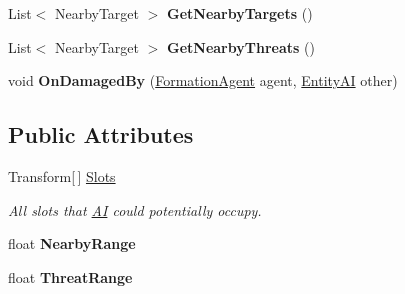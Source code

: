 \begin{DoxyCompactItemize}
\item 
\hypertarget{class_skyrates_1_1_a_i_1_1_formation_1_1_formation_owner_ac97695c48c5f56fbe39017b889326b50}{List$<$ Nearby\-Target $>$ {\bfseries Get\-Nearby\-Targets} ()}\label{class_skyrates_1_1_a_i_1_1_formation_1_1_formation_owner_ac97695c48c5f56fbe39017b889326b50}

\item 
\hypertarget{class_skyrates_1_1_a_i_1_1_formation_1_1_formation_owner_a79e5714cef6a98dc2cbbb5bcd837f475}{List$<$ Nearby\-Target $>$ {\bfseries Get\-Nearby\-Threats} ()}\label{class_skyrates_1_1_a_i_1_1_formation_1_1_formation_owner_a79e5714cef6a98dc2cbbb5bcd837f475}

\item 
\hypertarget{class_skyrates_1_1_a_i_1_1_formation_1_1_formation_owner_a8d9a35b95cc2963ba9741e5c93bc9670}{void {\bfseries On\-Damaged\-By} (\hyperlink{class_skyrates_1_1_a_i_1_1_formation_1_1_formation_agent}{Formation\-Agent} agent, \hyperlink{class_skyrates_1_1_entity_1_1_entity_a_i}{Entity\-A\-I} other)}\label{class_skyrates_1_1_a_i_1_1_formation_1_1_formation_owner_a8d9a35b95cc2963ba9741e5c93bc9670}

\end{DoxyCompactItemize}
\subsection*{Public Attributes}
\begin{DoxyCompactItemize}
\item 
Transform\mbox{[}$\,$\mbox{]} \hyperlink{class_skyrates_1_1_a_i_1_1_formation_1_1_formation_owner_a9d119a817ac3a7deebc5b41a66907cb2}{Slots}
\begin{DoxyCompactList}\small\item\em All slots that \hyperlink{namespace_skyrates_1_1_a_i}{A\-I} could potentially occupy. \end{DoxyCompactList}\item 
\hypertarget{class_skyrates_1_1_a_i_1_1_formation_1_1_formation_owner_aff55e138e2bc45bb42058558ac7637b6}{float {\bfseries Nearby\-Range}}\label{class_skyrates_1_1_a_i_1_1_formation_1_1_formation_owner_aff55e138e2bc45bb42058558ac7637b6}

\item 
\hypertarget{class_skyrates_1_1_a_i_1_1_formation_1_1_formation_owner_adf7176dd01dab732236a49e4e91ab5d5}{float {\bfseries Threat\-Range}}\label{class_skyrates_1_1_a_i_1_1_formation_1_1_formation_owner_adf7176dd01dab732236a49e4e91ab5d5}

\end{DoxyCompactItemize}


